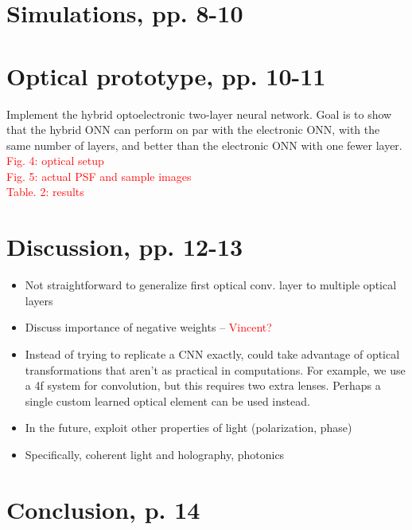 \documentclass[runningheads]{llncs}
\newcommand{\red}[1]{\textcolor{red}{#1}}
\begin{document}
\section{Simulations, pp. 8-10}
\label{sec:simulations}


\section{Optical prototype, pp. 10-11}
\label{sec:prototype}
Implement the hybrid optoelectronic two-layer neural network. Goal is to show that the hybrid ONN can perform on par with the electronic ONN, with the same number of layers, and better than the electronic ONN with one fewer layer.\\
\red{Fig. 4: optical setup} \\
\red{Fig. 5: actual PSF and sample images} \\
\red{Table. 2: results}

\section{Discussion, pp. 12-13}
\label{sec:discussion}
\begin{itemize}
\item Not straightforward to generalize first optical conv. layer to multiple optical layers
\item Discuss importance of negative weights – \red{Vincent?}
\item Instead of trying to replicate a CNN exactly, could take advantage of optical transformations that aren't as practical in computations. For example, we use a 4f system for convolution, but this requires two extra lenses. Perhaps a single custom learned optical element can be used instead.
\item In the future, exploit other properties of light (polarization, phase)	
\item Specifically, coherent light and holography, photonics
\end{itemize}

\section{Conclusion, p. 14}
\label{sec:conclusion}


\clearpage



\end{document}
